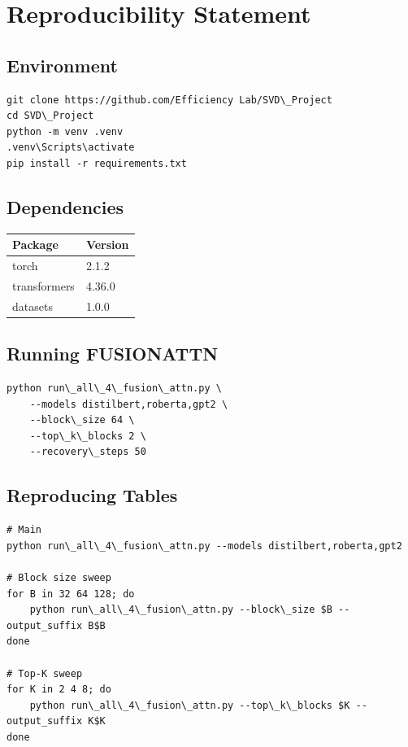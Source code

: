 \section{Reproducibility Statement}

\subsection{Environment}

\begin{lstlisting}
git clone https://github.com/Efficiency Lab/SVD\_Project
cd SVD\_Project
python -m venv .venv
.venv\Scripts\activate
pip install -r requirements.txt
\end{lstlisting}

\subsection{Dependencies}

\begin{table}[H]
\centering
\small
\begin{tabular}{ll}
\toprule
\textbf{Package} & \textbf{Version} \\
\midrule
torch & 2.1.2 \\
transformers & 4.36.0 \\
datasets & 1.0.0 \\
\bottomrule
\end{tabular}
\end{table}

\subsection{Running FUSIONATTN}

\begin{lstlisting}
python run\_all\_4\_fusion\_attn.py \
    --models distilbert,roberta,gpt2 \
    --block\_size 64 \
    --top\_k\_blocks 2 \
    --recovery\_steps 50
\end{lstlisting}

\subsection{Reproducing Tables}

\begin{lstlisting}
# Main
python run\_all\_4\_fusion\_attn.py --models distilbert,roberta,gpt2

# Block size sweep
for B in 32 64 128; do
    python run\_all\_4\_fusion\_attn.py --block\_size $B --output_suffix B$B
done

# Top-K sweep
for K in 2 4 8; do
    python run\_all\_4\_fusion\_attn.py --top\_k\_blocks $K --output_suffix K$K
done
\end{lstlisting}

